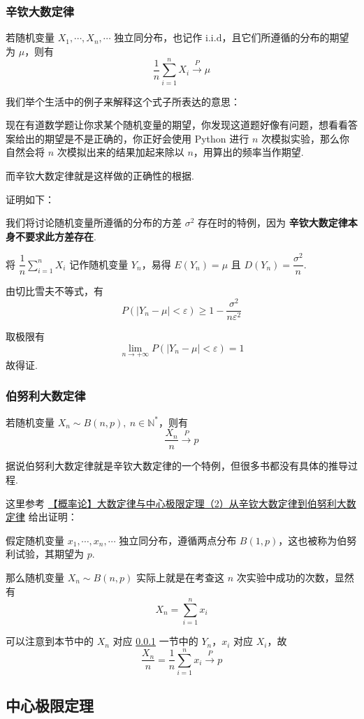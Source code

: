 \subsubsection{辛钦大数定律} \label{subsubsec:khinchin-law-of-large-numbers}

若随机变量 $X_1, \cdots, X_n, \cdots$ 独立同分布，也记作 $\mathrm{i.i.d}$，且它们所遵循的分布的期望为 $\mu$，则有
\[
  \dfrac{1}{n} \sum_{i = 1}^n X_i \overset{P}{\longrightarrow} \mu
\]

我们举个生活中的例子来解释这个式子所表达的意思：

现在有道数学题让你求某个随机变量的期望，你发现这道题好像有问题，想看看答案给出的期望是不是正确的，你正好会使用 Python 进行 $n$ 次模拟实验，那么你自然会将 $n$ 次模拟出来的结果加起来除以 $n$，用算出的频率当作期望.

而辛钦大数定律就是这样做的正确性的根据.

证明如下：

我们将讨论随机变量所遵循的分布的方差 $\sigma^2$ 存在时的特例，因为 \textbf{辛钦大数定律本身不要求此方差存在}.

将 $\dfrac{1}{n} \sum_{i = 1}^n X_i$ 记作随机变量 $Y_n$，易得 $E(Y_n) = \mu$ 且 $D(Y_n) = \dfrac{\sigma^2}{n}$.

由切比雪夫不等式，有
\[
  P(|Y_n - \mu| < \varepsilon) \geqslant 1 - \dfrac{\sigma^2}{n\varepsilon^2}
\]

取极限有
\[
  \lim_{n \to +\infty} P(|Y_n - \mu| < \varepsilon) = 1
\]
故得证.

\subsubsection{伯努利大数定律}

若随机变量 $X_n \sim B(n, p),\ n \in \mathbb{N}^*$，则有
\[
  \dfrac{X_n}{n} \overset{P}{\longrightarrow} p
\]

据说伯努利大数定律就是辛钦大数定律的一个特例，但很多书都没有具体的推导过程.

这里参考
\href{https://www.bilibili.com/video/av745161573}{【概率论】大数定律与中心极限定理（2）从辛钦大数定律到伯努利大数定律}
给出证明：

假定随机变量 $x_1, \cdots, x_n, \cdots$ 独立同分布，遵循两点分布 $B(1, p)$，这也被称为伯努利试验，其期望为 $p$.

那么随机变量 $X_n \sim B(n, p)$ 实际上就是在考查这 $n$ 次实验中成功的次数，显然有
\[
  X_n = \sum_{i = 1}^{n} x_i
\]

可以注意到本节中的 $X_n$ 对应 \ref{subsubsec:khinchin-law-of-large-numbers} 一节中的 $Y_n$，$x_i$ 对应 $X_i$，故
\[
  \dfrac{X_n}{n} = \dfrac{1}{n} \sum_{i = 1}^n x_i \overset{P}{\longrightarrow} p
\]

\subsection{中心极限定理}

